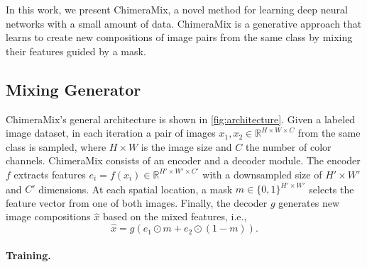 \documentclass{article}
\newcommand{\methodname}{ChimeraMix\xspace}
\begin{document}
In this work, we present \methodname, a novel method for learning deep neural networks with a small amount of data. 
\methodname is a generative approach that learns to create new compositions of image pairs from the same class by mixing their features guided by a mask.

\subsection{Mixing Generator}

\methodname's general architecture is shown in \cref{fig:architecture}.
Given a labeled image dataset, in each iteration a pair of images $x_1, x_2 \in \mathbb{R}^{H \times W \times C}$ from the same class is sampled, where $H \times W$ is the image size and $C$ the number of color channels.
\methodname consists of an encoder and a decoder module.
The encoder $f$ extracts features $e_i = f(x_i) \in \mathbb{R}^{H' \times W' \times C'}$ with a downsampled size of $H' \times W'$ and $C'$ dimensions. 
At each spatial location, a mask $m \in \{0, 1\}^{H' \times W'}$ selects the feature vector from one of both images.
Finally, the decoder $g$ generates new image compositions $\hat{x}$ based on the mixed features, i.e.,
\begin{equation}
    \hat{x} = g \left( e_1 \odot m + e_2 \odot (1 - m) \right).
    \label{eq:generation_process}
\end{equation}


\paragraph{Training.}
\end{document}

